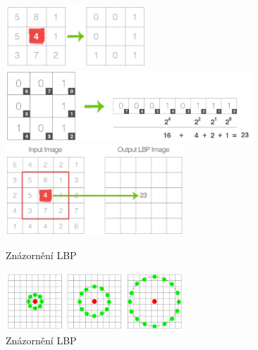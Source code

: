 \documentclass{report}
\begin{document}
\begin{figure}[H]
		\centering
		\includegraphics[width=200px]{./img/lbp_thresholding.jpg}
		\\[0.5cm]	
		\includegraphics[width=350px]{./img/lbp_calculation.jpg}
		\\[0.5cm]
		\includegraphics[width=253px]{./img/lbp_to_output.jpg}	
		\caption{Znázornění LBP}
\end{figure} 
 
\begin{figure}[H]
		\centering
		\includegraphics[width=253px]{./img/poem.png}	
		\caption{Znázornění LBP}
\end{figure}
\end{document}
